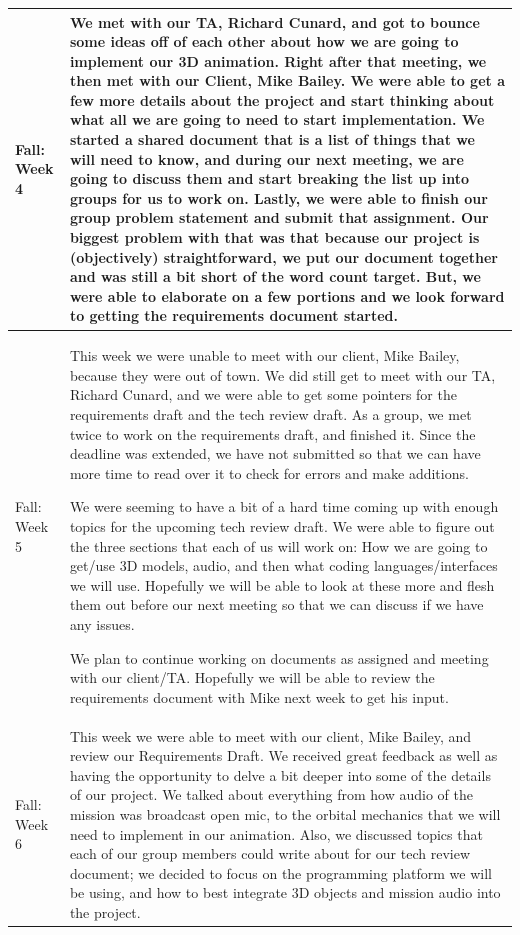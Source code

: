 \documentclass[onecolumn, draftclsnofoot,10pt, compsoc]{IEEEtran}
\begin{document}
\begin{longtable} {|p{1.5cm}|p{13.5cm}|} \hline
Fall: Week 4 & 
We met with our TA, Richard Cunard, and got to bounce some ideas off of each other about how we are going to implement our 3D animation. Right after that meeting, we then met with our Client, Mike Bailey. We were able to get a few more details about the project and start thinking about what all we are going to need to start implementation. We started a shared document that is a list of things that we will need to know, and during our next meeting, we are going to discuss them and start breaking the list up into groups for us to work on. Lastly, we were able to finish our group problem statement and submit that assignment. Our biggest problem with that was that because our project is (objectively) straightforward, we put our document together and was still a bit short of the word count target. But, we were able to elaborate on a few portions and we look forward to getting the requirements document started. \\ \hline

Fall: Week 5 & 
This week we were unable to meet with our client, Mike Bailey, because they were out of town. We did still get to meet with our TA, Richard Cunard, and we were able to get some pointers for the requirements draft and the tech review draft. As a group, we met twice to work on the requirements draft, and finished it. Since the deadline was extended, we have not submitted so that we can have more time to read over it to check for errors and make additions.

We were seeming to have a bit of a hard time coming up with enough topics for the upcoming tech review draft. We were able to figure out the three sections that each of us will work on: How we are going to get/use 3D models, audio, and then what coding languages/interfaces we will use. Hopefully we will be able to look at these more and flesh them out before our next meeting so that we can discuss if we have any issues.

We plan to continue working on documents as assigned and meeting with our client/TA. Hopefully we will be able to review the requirements document with Mike next week to get his input. \\ \hline

Fall: Week 6 & 
This week we were able to meet with our client, Mike Bailey, and review our Requirements Draft. We received great feedback as well as having the opportunity to delve a bit deeper into some of the details of our project. We talked about everything from how audio of the mission was broadcast open mic, to the orbital mechanics that we will need to implement in our animation. Also, we discussed topics that each of our group members could write about for our tech review document; we decided to focus on the programming platform we will be using, and how to best integrate 3D objects and mission audio into the project.


\end{longtable}
\end{document}
